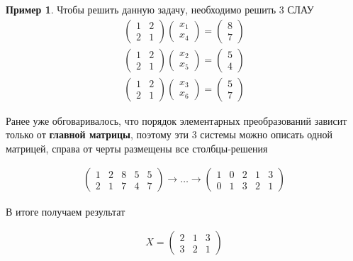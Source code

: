 \documentclass[]{article}
\theoremstyle{theorem}
\theoremstyle{definition}
\newtheorem{ex}{Пример}
\begin{document}
\begin{ex}
Чтобы решить данную задачу, необходимо решить 3 СЛАУ
\begin{gather*}
\begin{pmatrix}
	1 & 2 
	\\
	2 & 1
\end{pmatrix}
\begin{pmatrix}
	x_1
	\\
	x_4
\end{pmatrix}
=
\begin{pmatrix}
	8
	\\
	7
\end{pmatrix}
\\
\begin{pmatrix}
	1 & 2 
	\\
	2 & 1
\end{pmatrix}
\begin{pmatrix}
	x_2
	\\
	x_5
\end{pmatrix}
=
\begin{pmatrix}
	5
	\\
	4
\end{pmatrix}
\\
\begin{pmatrix}
	1 & 2 
	\\
	2 & 1
\end{pmatrix}
\begin{pmatrix}
	x_3
	\\
	x_6
\end{pmatrix}
=
\begin{pmatrix}
	5
	\\
	7
\end{pmatrix}
\end{gather*}

Ранее уже обговаривалось, что порядок элементарных преобразований зависит только от \textbf{главной матрицы}, поэтому эти 3 системы можно описать одной матрицей, справа от черты размещены все столбцы-решения

\begin{gather*}
\left(
\begin{array}{ll|lll}
	1 & 2 & 8 & 5 & 5
	\\
	2 & 1 & 7 & 4 & 7
\end{array}
\right)\rightarrow
\ldots
\rightarrow
\left(
\begin{array}{ll|lll}
	1 & 0 & 2 & 1 & 3
	\\
	0 & 1 & 3 & 2 & 1
\end{array}
\right)
\end{gather*}

В итоге получаем результат

\begin{gather*}
X=
\left(
\begin{matrix}
	2 & 1 & 3
	\\
	3 & 2 & 1
\end{matrix}\right)
\end{gather*}
\end{ex}
\end{document}
